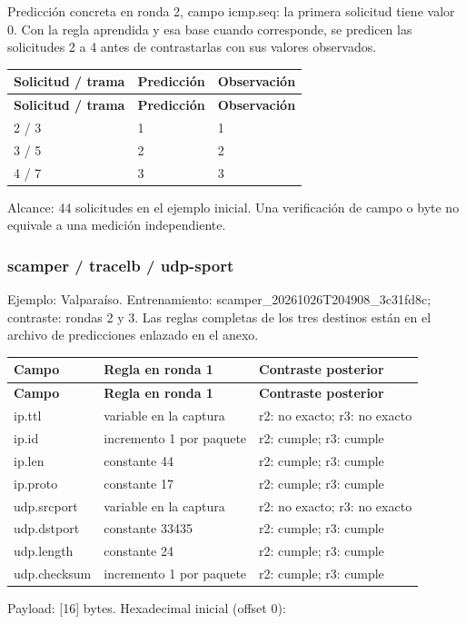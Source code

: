 Predicción concreta en ronda 2, campo icmp.seq: la primera solicitud tiene valor 0. Con la regla aprendida y esa base cuando corresponde, se predicen las solicitudes 2 a 4 antes de contrastarlas con sus valores observados.

\begingroup
\fontsize{9}{11}\selectfont
\addtocounter{table}{-1}
\begin{longtable}{p{3.2cm}p{5.1cm}p{5.1cm}}
\toprule
\textbf{Solicitud / trama} & \textbf{Predicción} & \textbf{Observación} \\ \midrule
\endfirsthead
\toprule
\textbf{Solicitud / trama} & \textbf{Predicción} & \textbf{Observación} \\ \midrule
\endhead
2 / 3 & 1 & 1 \\
3 / 5 & 2 & 2 \\
4 / 7 & 3 & 3 \\
\bottomrule
\end{longtable}
\endgroup
Alcance: 44 solicitudes en el ejemplo inicial. Una verificación de campo o byte no equivale a una medición independiente.

\subsubsection{scamper / tracelb / udp-sport}
Ejemplo: Valparaíso. Entrenamiento: scamper\_\allowbreak{}20261026T204908\_\allowbreak{}3c31fd8c; contraste: rondas 2 y 3. Las reglas completas de los tres destinos están en el archivo de predicciones enlazado en el anexo.

\begingroup
\fontsize{9}{11}\selectfont
\addtocounter{table}{-1}
\begin{longtable}{p{3.1cm}p{5.8cm}p{5.1cm}}
\toprule
\textbf{Campo} & \textbf{Regla en ronda 1} & \textbf{Contraste posterior} \\ \midrule
\endfirsthead
\toprule
\textbf{Campo} & \textbf{Regla en ronda 1} & \textbf{Contraste posterior} \\ \midrule
\endhead
ip.ttl & variable en la captura & r2: no exacto; r3: no exacto \\
ip.id & incremento 1 por paquete & r2: cumple; r3: cumple \\
ip.len & constante 44 & r2: cumple; r3: cumple \\
ip.proto & constante 17 & r2: cumple; r3: cumple \\
udp.srcport & variable en la captura & r2: no exacto; r3: no exacto \\
udp.dstport & constante 33435 & r2: cumple; r3: cumple \\
udp.length & constante 24 & r2: cumple; r3: cumple \\
udp.checksum & incremento 1 por paquete & r2: cumple; r3: cumple \\
\bottomrule
\end{longtable}
\endgroup
Payload: [16] bytes. Hexadecimal inicial (offset 0):

